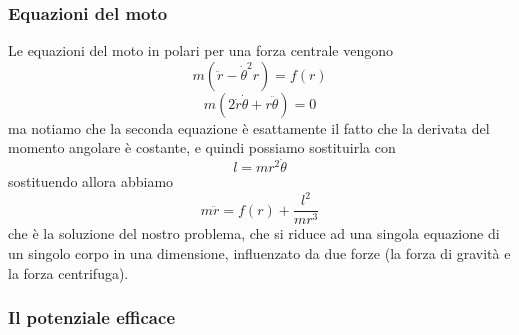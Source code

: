 \documentclass[11pt]{scrartcl}
\begin{document}
	\subsubsection{Equazioni del moto}
	Le equazioni del moto in polari per una forza centrale vengono
	$$m\left(\ddot{r}-\dot{\theta}^2r\right)=f(r)$$
	$$m\left(2\dot{r}\dot{\theta}+r\ddot{\theta}\right)=0$$
	ma notiamo che la seconda equazione è esattamente il fatto che la derivata del momento angolare è costante, e quindi possiamo sostituirla con
	$$l=mr^2\dot{\theta}$$
	sostituendo allora abbiamo
	$$m\ddot{r}=f(r)+\frac{l^2}{mr^3}$$
	che è la soluzione del nostro problema, che si riduce ad una singola equazione di un singolo corpo in una dimensione, influenzato da due forze (la forza di gravità e la forza centrifuga). 
	
	\subsubsection{Il potenziale efficace}
	
\end{document}
